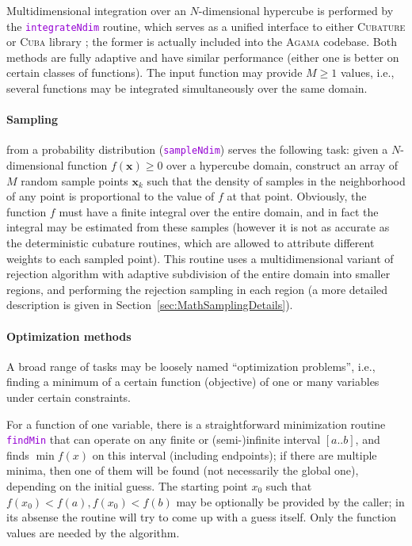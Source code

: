 \documentclass[12pt]{article}
\newcommand{\Agama}{\textsc{Agama}\xspace}
\newcommand{\ttt}[1]{\textcolor{darkviolet}{\texttt{#1}}}
\newcommand{\bx}{\boldsymbol{x}}
\let\oldparagraph\paragraph
\renewcommand{\paragraph}[1]{\vspace{-2mm}\oldparagraph{#1}}
\begin{document}
Multidimensional integration over an $N$-dimensional hypercube is performed by the \ttt{integrateNdim} routine, which serves as a unified interface to either \textsc{Cubature} or \textsc{Cuba} library \cite{Cuba}; the former is actually included into the \Agama codebase. Both methods are fully adaptive and have similar performance (either one is better on certain classes of functions). The input function may provide $M\ge 1$ values, i.e., several functions may be integrated simultaneously over the same domain.

\paragraph{Sampling} \label{sec:Sampling}  from a probability distribution (\ttt{sampleNdim}) serves the following task: given a $N$-dimensional function $f(\bx)\ge 0$ over a hypercube domain, construct an array of $M$ random sample points $\bx_k$ such that the density of samples in the neighborhood of any point is proportional to the value of $f$ at that point. Obviously, the function $f$ must have a finite integral over the entire domain, and in fact the integral may be estimated from these samples (however it is not as accurate as the deterministic cubature routines, which are allowed to attribute different weights to each sampled point). This routine uses a multidimensional variant of rejection algorithm with adaptive subdivision of the entire domain into smaller regions, and performing the rejection sampling in each region (a more detailed description is given in Section~\ref{sec:MathSamplingDetails}).

\paragraph{Optimization methods}
A broad range of tasks may be loosely named ``optimization problems'', i.e., finding a minimum of a certain function (objective) of one or many variables under certain constraints.

For a function of one variable, there is a straightforward minimization routine \ttt{findMin} that can operate on any finite or (semi-)infinite interval $[a..b]$, and finds $\min f(x)$ on this interval (including endpoints); if there are multiple minima, then one of them will be found (not necessarily the global one), depending on the initial guess. The starting point $x_0$ such that  $f(x_0)<f(a), f(x_0)<f(b)$ may be optionally be provided by the caller; in its absense the routine will try to come up with a guess itself. Only the function values are needed by the algorithm.
\end{document}
